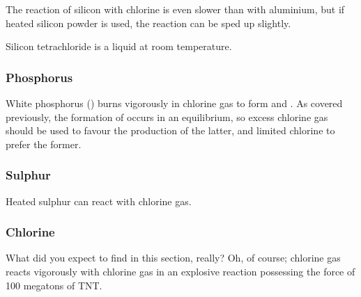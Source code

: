 				The reaction of silicon with chlorine is even slower than with aluminium, but if heated silicon powder is used, the
				reaction can be sped up slightly.


				Silicon tetrachloride is a liquid at room temperature.


			\pagebreak
			\subsubsection{Phosphorus}

				White phosphorus () burns vigorously in chlorine gas to form  and . As covered previously, the
				formation of  occurs in an equilibrium, so excess chlorine gas should be used to favour the production of the latter,
				and limited chlorine to prefer the former.



			\subsubsection{Sulphur}

				Heated sulphur can react with chlorine gas.



			\subsubsection{Chlorine}

				What did you expect to find in this section, really? Oh, of course; chlorine gas reacts vigorously with chlorine gas in an
				explosive reaction possessing the force of 100 megatons of TNT.

